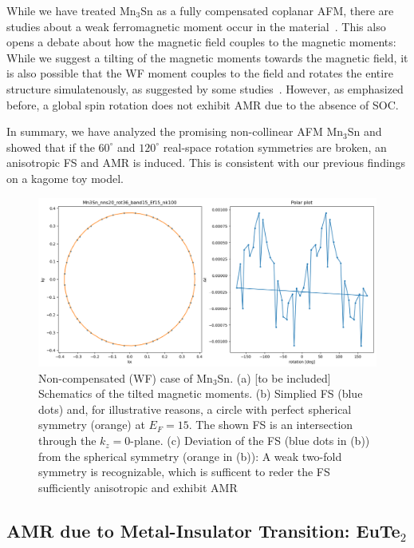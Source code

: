 \documentclass[prb,showpacs,amsmath,amssymb,superscriptaddress,twocolumn,floatfix]{revtex4-1}
\begin{document}
While we have treated Mn$_3$Sn as a fully compensated coplanar AFM, there are studies about a weak ferromagnetic moment occur in the material~\cite{Tomiyashi:1982}. This also opens a debate about how the magnetic field couples to the magnetic moments: While we suggest a tilting of the magnetic moments towards the magnetic field, it is also possible that the WF moment couples to the field and rotates the entire structure simulatenously, as suggested by some studies~\cite{Wu:2023}. However, as emphasized before, a global spin rotation does not exhibit AMR due to the absence of SOC. 

In summary, we have analyzed the promising non-collinear AFM Mn$_3$Sn and showed that if the $60^\circ$ and $120^\circ$ real-space rotation symmetries are broken, an anisotropic FS and AMR is induced. This is consistent with our previous findings on a kagome toy model.


\begin{figure}
	\centering
	\includegraphics[width=\linewidth]{img/Mn3Sn_nns20_rot36_band15_Ef15_nk100}
	\caption{Non-compensated (WF) case of Mn$_3$Sn. {\color{red} (a) [to be included] Schematics of the tilted magnetic moments}. (b) Simplied FS (blue dots) and, for illustrative reasons, a circle with perfect spherical symmetry (orange) at $E_F = 15$. The shown FS is an intersection through the $k_z = 0$-plane. (c) Deviation of the FS (blue dots in (b)) from the spherical symmetry (orange in (b)): A weak two-fold symmetry is recognizable, which is sufficent to reder the FS sufficiently anisotropic and exhibit AMR}
	\label{fig:mn3sn_36deg_FS}
\end{figure}


\subsection{AMR due to Metal-Insulator Transition: EuTe$_2$}
\label{sec_I_EuTe2}
\end{document}
